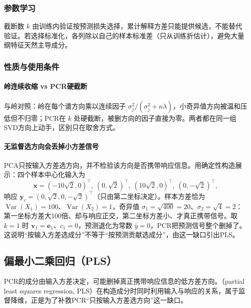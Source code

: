 \subsubsection{参数学习}
\label{sec:regression-pcr-learning}

截断数 $k$ 由训练内验证按预测损失选择，累计解释方差只能提供候选，不能替代验证。若选择标准化，各列除以自己的样本标准差（只从训练折估计），避免大量纲特征天然主导成分。

\subsubsection{性质与使用条件}
\label{sec:regression-pcr-theory}

\paragraph{岭连续收缩 vs PCR硬截断}

与岭对照：岭在每个谱方向乘以连续因子 $\sigma_j^2/(\sigma_j^2+n\lambda)$，小奇异值方向被温和压低但不归零；PCR在 $k$ 处硬截断，被删方向的因子直接为零。两者都在同一组SVD方向上动手，区别只在取舍方式。

\paragraph{无监督选方向会丢掉小方差信号}

PCA只按输入方差选方向，并不检验该方向是否携带响应信息。用确定性构造展示：四个样本中心化输入为
\[
  \bm x=(-10\sqrt2,0)^{\top},\ (0,\sqrt2)^{\top},\ (10\sqrt2,0)^{\top},\ (0,-\sqrt2)^{\top},
\]
响应 $\bm y_c=(0,\sqrt2,0,-\sqrt2)^{\top}$（只由第二坐标决定）。样本方差恰为 $\operatorname{Var}(X_1)=100$、$\operatorname{Var}(X_2)=1$，奇异值 $\sigma_1=\sqrt{400}=20$、$\sigma_2=\sqrt{4}=2$：第一坐标方差大100倍、却与响应正交，第二坐标方差小、才真正携带信号。取 $k=1$ 时 $\bm v_1=\bm e_1$、$c_1=0$，预测退化为常数 $\bar y=0$，PCR把预测信号整个删掉了。这说明“按输入方差选成分”不等于“按预测贡献选成分”，由这一缺口引出PLS。

\subsection{偏最小二乘回归（PLS）}
\label{sec:regression-pls}

PCR的成分由输入方差决定，可能删掉真正携带响应信息的低方差方向。（partial least squares regression, PLS）在构造成分时同时利用输入与响应的关系，属于监督降维，正是为了补救PCR“只按输入方差选方向”这一缺口。

